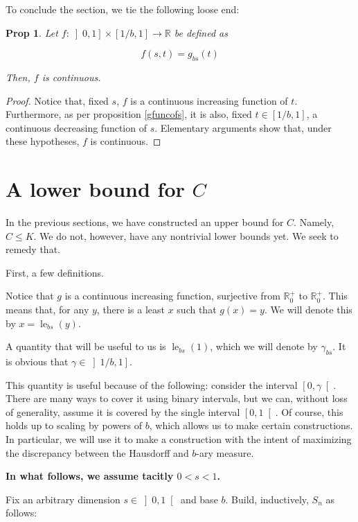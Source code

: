 \documentclass[11pt, reqno]{amsart}
\newcommand{\R}{\mathbb{R}}
\newtheorem{prop}{Prop}
\DeclareMathOperator{\len}{le}
\begin{document}
To conclude the section, we tie the following loose end:

\begin{prop}
Let $f : \left]0, 1\right] \times \left[1/b, 1\right] \to \R$ be defined as

\[f(s, t) = g_{bs}(t)\]

Then, $f$ is continuous.
\end{prop}

\begin{proof}
Notice that, fixed $s$, $f$ is a continuous increasing function of $t$. Furthermore, as per proposition \ref{gfuncofs}, it is also, fixed $t \in \left[1/b, 1 \right]$, a continuous decreasing function of $s$. Elementary arguments show that, under these hypotheses, $f$ is continuous. %
\end{proof}

\section{A lower bound for $C$}\label{seclowerbound}

In the previous sections, we have constructed an upper bound for $C$. Namely, $C \leq K$. We do not, however, have any nontrivial lower bounds yet. We seek to remedy that.

First, a few definitions.

Notice that $g$ is a continuous increasing function, surjective from $\R^+_0$ to $\R^+_0$. This means that, for any $y$, there is a least $x$ such that $g(x) = y$. We will denote this by $x = \len_{bs}(y)$.

A quantity that will be useful to us is $\len_{bs}(1)$, which we will denote by $\gamma_{bs}$. It is obvious that $\gamma \in \left] 1/b, 1 \right]$.

This quantity is useful because of the following: consider the interval $\left[0, \gamma \right[$. There are many ways to cover it using binary intervals, but we can, without loss of generality, assume it is covered by the single interval $\left[0, 1 \right[$. Of course, this holds up to scaling by powers of $b$, which allows us to make certain constructions. In particular, we will use it to make a construction with the intent of maximizing the discrepancy between the Hausdorff and $b$-ary measure.

\textbf{In what follows, we assume tacitly $0 < s < 1$.}

Fix an arbitrary dimension $s \in \left]0, 1 \right[$ and base $b$. Build, inductively, $S_n$ as follows:
\end{document}
